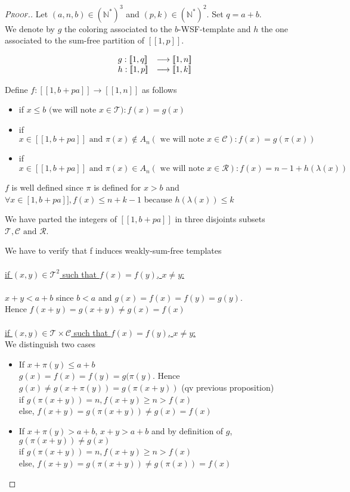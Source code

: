 \begin{proof}[\textsc{Proof.}]
Let \((a,n,b) \in (\mathbb{N}^*)^3\) and \( (p,k) \in (\mathbb{N}^*)^2\). Set \(q = a + b\). \\
We denote by \(g\) the coloring associated to the \(b\)-WSF-template  and \(h\) the one associated 
to the sum-free partition of \([\![1,p]\!]\).

\[
\begin{array}{l l}
	g : [\![1, q]\!] & \longrightarrow [\![1,n]\!] \\
	h : [\![1,p]\!] & \longrightarrow [\![1,k]\!]
\end{array}
\]

Define \( f : [\![1,b+pa]\!] \longrightarrow [\![1,n]\!] \) as follows

\begin{itemize}
	\item if  \(x\leqslant b \text{ (we will note }x \in \mathcal{T}): f(x)=g(x)\)
	\item if \( x \in [\![1,b+pa]\!] \text{ and } \pi(x) \notin A_n (\text{ we will note } x \in \mathcal{C}): f(x)=g(\pi(x))\)
	\item if \( x \in [\![1,b+pa]\!]  \text{ and }\pi(x) \in A_n (\text{ we will note } x \in \mathcal{R}): f(x)=n-1+h(\lambda(x))\)
\end{itemize}

\(f\) is well defined since \(\pi\) is defined for \(x>b\) and \(\forall x \in \![1,b+pa]\!], f(x)\leqslant n+k-1\) because \(h(\lambda(x))\leqslant k\)

We have parted the integers of \([\![1,b+pa]\!]\) in three disjoints subsets \(\mathcal{T},\mathcal{C} \text{ and } \mathcal{R}\).

We have to verify that f induces weakly-sum-free templates\\
\\
\underline{if \((x,y) \in \mathcal{T}^2\) such that \(f(x)=f(y)\), \(x \neq y\):}\\
\\\(x+y<a+b\) since \(b<a\) and \(g(x)=f(x)=f(y)=g(y)\).
\\Hence \(f(x+y)=g(x+y)\neq g(x)=f(x)\)
\\\\
\underline{if \((x,y) \in \mathcal{T} \times \mathcal{C}\) such that \(f(x)=f(y)\), \(x \neq y\):}\\
We distinguish two cases

\begin{itemize}
\item If \(x+\pi(y)\leqslant a+b\)
\\\(g(x)=f(x)=f(y)=g(\pi(y)\). Hence \(g(x)\neq g(x+\pi(y))=g(\pi(x+y))\) (qv previous proposition)
\\if \(g(\pi(x+y))=n, f(x+y)\geqslant n > f(x)\)
\\else, \(f(x+y)=g(\pi(x+y))\neq g(x)=f(x)\)
\item If \(x+\pi(y)> a+b\), \(x+y>a+b\) and by definition of \(g\), \(g(\pi(x+y))\neq g(x)\)
\\if \(g(\pi(x+y))=n, f(x+y)\geqslant n > f(x)\)
\\else, \(f(x+y)=g(\pi(x+y))\neq g(\pi(x))=f(x)\)
\end{itemize}


\end{proof}
